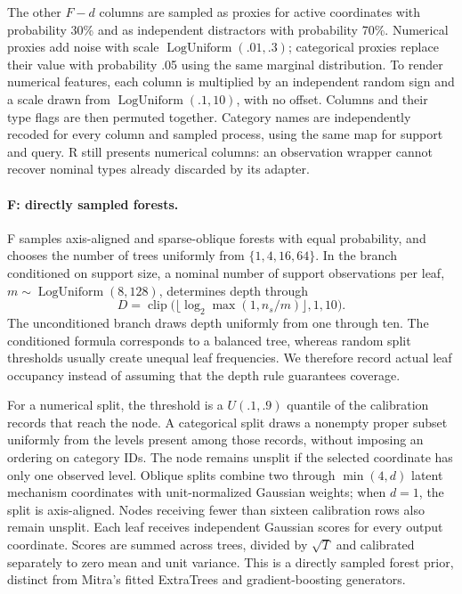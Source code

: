 \documentclass[11pt]{article}
\begin{document}
The other $F-d$ columns are sampled as proxies for active coordinates with probability 30\% and as independent distractors with probability 70\%. Numerical proxies add noise with scale $\operatorname{LogUniform}(.01,.3)$; categorical proxies replace their value with probability .05 using the same marginal distribution. To render numerical features, each column is multiplied by an independent random sign and a scale drawn from $\operatorname{LogUniform}(.1,10)$, with no offset. Columns and their type flags are then permuted together. Category names are independently recoded for every column and sampled process, using the same map for support and query. R still presents numerical columns: an observation wrapper cannot recover nominal types already discarded by its adapter.

\paragraph{F: directly sampled forests.}
F samples axis-aligned and sparse-oblique forests with equal probability, and chooses the number of trees uniformly from $\{1,4,16,64\}$. In the branch conditioned on support size, a nominal number of support observations per leaf, $m\sim\operatorname{LogUniform}(8,128)$, determines depth through
\[
 D=\operatorname{clip}\bigl(\lfloor\log_2\max(1,n_s/m)\rfloor,1,10\bigr).
\]
The unconditioned branch draws depth uniformly from one through ten. The conditioned formula corresponds to a balanced tree, whereas random split thresholds usually create unequal leaf frequencies. We therefore record actual leaf occupancy instead of assuming that the depth rule guarantees coverage.

For a numerical split, the threshold is a $U(.1,.9)$ quantile of the calibration records that reach the node. A categorical split draws a nonempty proper subset uniformly from the levels present among those records, without imposing an ordering on category IDs. The node remains unsplit if the selected coordinate has only one observed level. Oblique splits combine two through $\min(4,d)$ latent mechanism coordinates with unit-normalized Gaussian weights; when $d=1$, the split is axis-aligned. Nodes receiving fewer than sixteen calibration rows also remain unsplit. Each leaf receives independent Gaussian scores for every output coordinate. Scores are summed across trees, divided by $\sqrt{T}$ and calibrated separately to zero mean and unit variance. This is a directly sampled forest prior, distinct from Mitra's fitted ExtraTrees and gradient-boosting generators.
\end{document}
